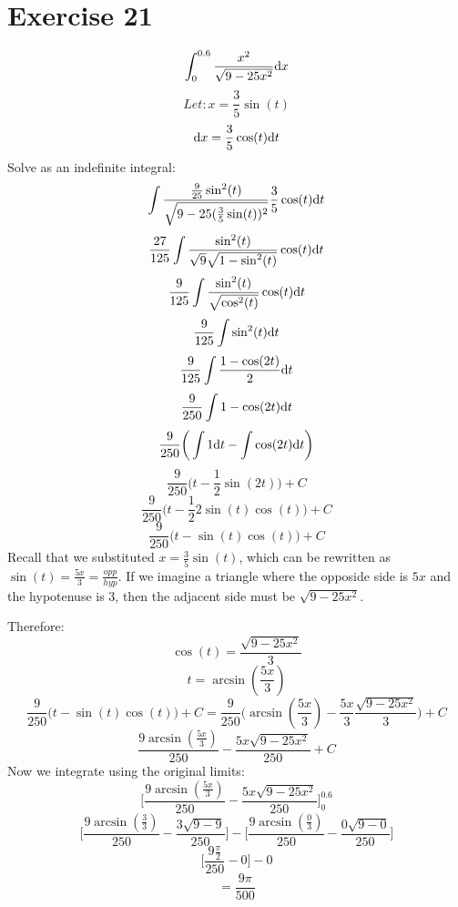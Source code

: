 \documentclass{math}
\begin{document}
\section*{Exercise 21}
\[ \int_{0}^{0.6}{\frac{x^{2}}{\sqrt{9-25x^{2}}}\mathrm{d}{x}} \]
\[ Let: x = \frac{3}{5}\sin(t) \]
\[ \mathrm{d}{x} = \frac{3}{5}\cos(t)\mathrm{d}{t} \]
Solve as an indefinite integral:
\[ \int{\frac{\frac{9}{25}\sin^{2}(t)}{\sqrt{9-25(\frac{3}{5}\sin(t))^{2}}}
   \frac{3}{5}\cos(t)\mathrm{d}{t}} \]
\[ \frac{27}{125}\int{\frac{\sin^{2}(t)}
   {\sqrt{9}\sqrt{1-\sin^{2}(t)}}\cos(t)\mathrm{d}{t}} \]
\[ \frac{9}{125}\int{\frac{\sin^{2}(t)}{\sqrt{\cos^{2}(t)}}\cos(t)\mathrm{d}{t}} \]
\[ \frac{9}{125}\int{\sin^{2}(t)\mathrm{d}{t}} \]
\[ \frac{9}{125}\int{\frac{1-\cos(2t)}{2}\mathrm{d}{t}} \]
\[ \frac{9}{250}\int{1-\cos(2t)\mathrm{d}{t}} \]
\[ \frac{9}{250}\bigg(\int{1\mathrm{d}{t}}-\int{\cos(2t)\mathrm{d}{t}}\bigg) \]
\[ \frac{9}{250}\bigg(t-\frac{1}{2}\sin(2t)\bigg)+C \]
\[ \frac{9}{250}\bigg(t-\frac{1}{2}2\sin(t)\cos(t)\bigg)+C \]
\[ \frac{9}{250}\bigg(t-\sin(t)\cos(t)\bigg)+C \]
Recall that we substituted \( x = \frac{3}{5}\sin(t) \), which can be rewritten
as \( \sin(t) = \frac{5x}{3} = \frac{opp}{hyp} \). If we imagine a triangle
where the opposide side is \( 5x \) and the hypotenuse is 3, then the adjacent
side must be \( \sqrt{9-25x^{2}} \).
\begin{center}
\end{center}
Therefore:
\[ \cos(t) = \frac{\sqrt{9-25x^{2}}}{3} \]
\[ t = \arcsin(\frac{5x}{3}) \]
\[ \frac{9}{250}\bigg(t-\sin(t)\cos(t)\bigg)+C =
   \frac{9}{250}\bigg(\arcsin(\frac{5x}{3})-
   \frac{5x}{3}\frac{\sqrt{9-25x^{2}}}{3}\bigg)+C \]
\[ \frac{9\arcsin(\frac{5x}{3})}{250}-\frac{5x\sqrt{9-25x^{2}}}{250}+C \]
Now we integrate using the original limits:
\[ \bigg[\frac{9\arcsin(\frac{5x}{3})}{250}-
   \frac{5x\sqrt{9-25x^{2}}}{250}\bigg]_{0}^{0.6} \]
\[ \bigg[\frac{9\arcsin(\frac{3}{3})}{250}-\frac{3\sqrt{9-9}}{250}\bigg]-
   \bigg[\frac{9\arcsin(\frac{0}{3})}{250}-\frac{0\sqrt{9-0}}{250}\bigg] \]
\[ \bigg[\frac{9\frac{\pi}{2}}{250}-0\bigg]-0 \]
\[ = \frac{9\pi}{500} \]
\end{document}
